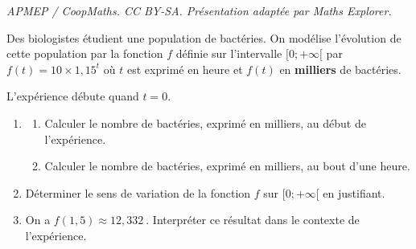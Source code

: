 \documentclass[10pt]{article}
\providecommand{\np}[2][]{{#2~#1}}
\begin{document}
\noindent\textit{APMEP / CoopMaths. CC BY-SA. Présentation adaptée par Maths Explorer.}\par\medskip
Des biologistes étudient une population de bactéries. On modélise l'évolution de cette population par la fonction $f$ définie sur l'intervalle $[0 ; +\infty[$ par $f(t) = 10 \times 1,15^t$ où $t$ est exprimé en heure et $f(t)$ en \textbf{milliers} de bactéries.

L'expérience débute quand $t=0$.

\begin{enumerate}
	\item
	\begin{enumerate}
		\item Calculer le nombre de bactéries, exprimé en milliers, au début de l'expérience.
		\item Calculer le nombre de bactéries, exprimé en milliers, au bout d'une heure.
	\end{enumerate}
	\item Déterminer le sens de variation de la fonction $f$ sur $[0 ; +\infty[$ en justifiant.
	\item On a $f(1,5) \approx \np{12,332}$. Interpréter ce résultat dans le contexte de l'expérience.
\end{enumerate}
\end{document}

